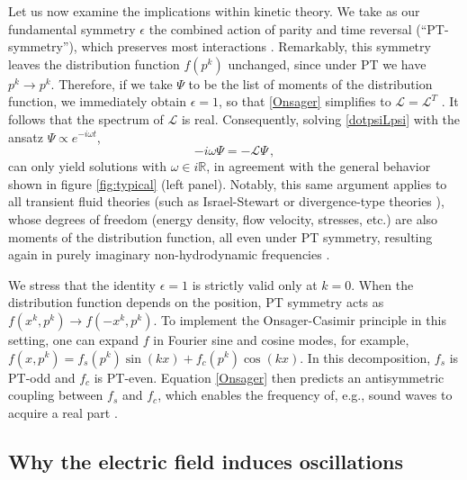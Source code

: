 \documentclass[a4paper, amsfonts, amssymb, amsmath, reprint, showkeys, nofootinbib, twoside,notitlepage,onecolumn]{revtex4-1}
\theoremstyle{definition}
\theoremstyle{theorem}
\begin{document}
Let us now examine the implications within kinetic theory. We take as our fundamental symmetry $\epsilon$ the combined action of parity and time reversal (``PT-symmetry''), which preserves most interactions \cite[\S 2.6]{weinbergQFT_1995}. Remarkably, this symmetry leaves the distribution function $f(p^k)$ unchanged, since under PT we have $p^k \rightarrow p^k$. Therefore, if we take $\Psi$ to be the list of moments of the distribution function, we immediately obtain $\epsilon = 1$, so that \eqref{Onsager} simplifies to $\mathcal{L} = \mathcal{L}^T$ \cite{GavassinoGapless:2024rck,GavassinoConvergence:2024xwf}. It follows that the spectrum of $\mathcal{L}$ is real. Consequently, solving \eqref{dotpsiLpsi} with the ansatz $\Psi \propto e^{-i\omega t}$,
\begin{equation}
-i\omega \Psi =- \mathcal{L} \Psi \, ,
\end{equation}
can only yield solutions with $\omega \in i\mathbb{R}$, in agreement with the general behavior shown in figure \ref{fig:typical} (left panel). Notably, this same argument applies to all transient fluid theories (such as Israel-Stewart \cite{Israel_Stewart_1979} or divergence-type theories \cite{Liu1986}), whose degrees of freedom (energy density, flow velocity, stresses, etc.) are also moments of the distribution function, all even under PT symmetry, resulting again in purely imaginary non-hydrodynamic frequencies \cite{GavassinoSymmetric2022nff}.

We stress that the identity $\epsilon = 1$ is strictly valid only at $k = 0$. When the distribution function depends on the position, PT symmetry acts as $f(x^k, p^k) \to f(-x^k, p^k)$. To implement the Onsager-Casimir principle in this setting, one can expand $f$ in Fourier sine and cosine modes, for example, $f(x,p^k) = f_s(p^k)\sin(kx) + f_c(p^k)\cos(kx)$. In this decomposition, $f_s$ is PT-odd and $f_c$ is PT-even. Equation \eqref{Onsager} then predicts an antisymmetric coupling between $f_s$ and $f_c$, which enables the frequency of, e.g., sound waves to acquire a real part \cite{GavassinoSymmetric2022nff}.

\vspace{-0.2cm}
\subsection{Why the electric field induces oscillations}\label{iiib}
\vspace{-0.2cm}
\end{document}
